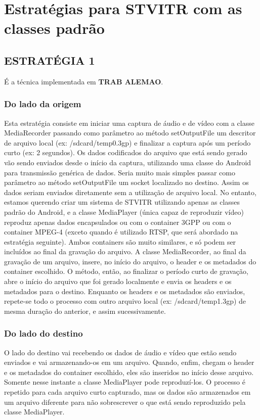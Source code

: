 \documentclass{acm_proc_article-sp}
\newcommand{\todo}[1]{\textcolor[rgb]{1.00,0.00,0.00}{\bf \uppercase{#1}}}
\begin{document}
\section{Estratégias para STVITR com as classes padrão}

\subsection{ESTRATÉGIA 1}
É a técnica implementada em \todo{trab alemao}.

\subsubsection{Do lado da origem}

Esta estratégia consiste em iniciar uma captura de áudio e de vídeo com a classe MediaRecorder passando como parâmetro ao método setOutputFile um descritor de arquivo local (ex: /sdcard/temp0.3gp) e finalizar a captura após um período curto (ex: 2 segundos). Os dados codificados do arquivo que está sendo gerado vão sendo enviados desde o início da captura, utilizando uma classe do Android para transmissão genérica de dados. Seria muito mais simples passar como parâmetro ao método setOutputFile um socket localizado no destino. Assim os dados seriam enviados diretamente sem a utilização de arquivo local. No entanto, estamos querendo criar um sistema de STVITR utilizando apenas as classes padrão do Android, e a classe MediaPlayer (única capaz de reproduzir vídeo) reproduz apenas dados encapsulados ou com o container 3GPP ou com o container MPEG-4 (exceto quando é utilizado RTSP, que será abordado na estratégia seguinte). Ambos containers são muito similares, e só podem ser incluídos ao final da gravação do arquivo. A classe MediaRecorder, ao final da gravação de um arquivo, insere, no início do arquivo, o header e os metadados do container escolhido. O método, então, ao finalizar o período curto de gravação, abre o início do arquivo que foi gerado localmente e envia os headers e os metadados para o destino. Enquanto os headers e os metadados são enviados, repete-se todo o processo com outro arquivo local (ex: /sdcard/temp1.3gp) de mesma duração do anterior, e assim sucessivamente.

\subsubsection{Do lado do destino}

O lado do destino vai recebendo os dados de áudio e vídeo que estão sendo enviados e vai armazenando-os em um arquivo. Quando, enfim, chegam o header e os metadados do container escolhido, eles são inseridos no início desse arquivo. Somente nesse instante a classe MediaPlayer pode reproduzí-los. O processo é repetido para cada arquivo curto capturado, mas os dados são armazenados em um arquivo diferente para não sobrescrever o que está sendo reproduzido pela classe MediaPlayer.
\end{document}
